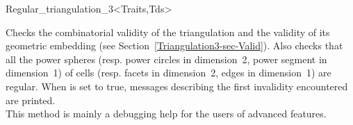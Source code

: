 \begin{ccClassTemplate}{Regular_triangulation_3<Traits,Tds>}
\begin{ccAdvanced}
{Checks the combinatorial validity of the triangulation and the
validity of its geometric embedding (see
Section~\ref{Triangulation3-sec-Valid}). Also checks that all the
power spheres (resp. power circles in dimension~2, power segment in
dimension~1) of cells (resp. facets in dimension~2, edges in
dimension~1) are regular. When 
is set to true, messages describing the first invalidity encountered
are printed.\\ This method is mainly a debugging help for the users of
advanced features.
}
\end{ccAdvanced}

\end{ccClassTemplate}











